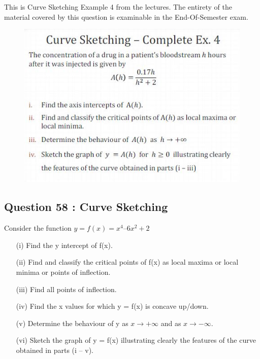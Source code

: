 \documentclass[]{article}
\begin{document}
This is Curve Sketching Example 4 from the lectures. The entirety of the material covered by this question is examinable in the End-Of-Semester exam.
\begin{figure}[h!]
	\centering
	\includegraphics[width=0.6\linewidth]{Q18curvesketching}
	
\end{figure}

\newpage
\subsection*{Question 58 : Curve Sketching}
Consider the function $y = f(x) = x^4 – 6x^2 + 2$
\begin{itemize}
	\item[(i)] Find the y intercept of f(x). 
	
	\item[(ii)] Find and classify the critical points of f(x) as local maxima or local minima or points of inflection. 
	
	\item[(iii)] Find all points of inflection. 
	
	\item[(iv)] Find the x values for which y = f(x) is concave up/down. 
	
	\item[(v)] Determine the behaviour of y as $x \to +\infty$ and as $x \to -\infty$. 
	
	\item[(vi)] Sketch the graph of y = f(x) illustrating clearly the features of the curve obtained in parts (i – v). 
\end{itemize}
\end{document}
